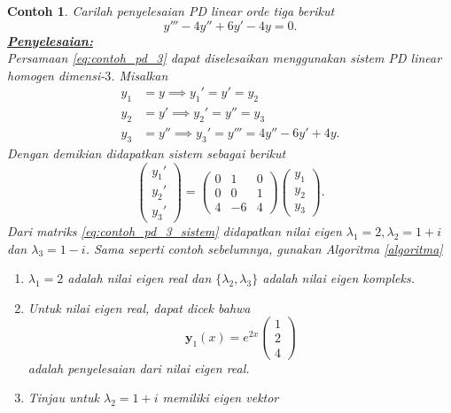 \documentclass[a4paper]{article}
\theoremstyle{definisi}
\newtheorem{contoh}{Contoh}[section]
\newcommand{\penyelesaian}{\textbf{\underline{Penyelesaian:}}\\}
\numberwithin{equation}{section}
\begin{document}
  \begin{contoh}
    Carilah penyelesaian PD linear orde tiga berikut
    \begin{equation}\label{eq:contoh_pd_3}
      y''' - 4y'' + 6y' - 4y = 0.
    \end{equation}
    \penyelesaian
    Persamaan \eqref{eq:contoh_pd_3} dapat diselesaikan menggunakan sistem PD linear homogen dimensi-$3$. Misalkan
    \begin{align*}
      y_1 &= y \implies y_1' = y' = y_2\\
      y_2 &= y' \implies y_2' = y'' = y_3\\
      y_3 &= y''\implies y_3' = y''' = 4y'' - 6y' + 4y.
    \end{align*}
    Dengan demikian didapatkan sistem sebagai berikut
    \begin{equation}\label{eq:contoh_pd_3_sistem}
      \begin{pmatrix}
        y_1'\\
        y_2'\\
        y_3'
      \end{pmatrix} = \begin{pmatrix}
        0 & 1 & 0\\
        0 & 0 & 1\\
        4 & -6 & 4
      \end{pmatrix}\begin{pmatrix}
        y_1\\
        y_2\\
        y_3
      \end{pmatrix}.
    \end{equation}
    Dari matriks \eqref{eq:contoh_pd_3_sistem} didapatkan nilai eigen $\lambda_1 = 2, \lambda_2 = 1+i$ dan $\lambda_3 = 1-i$. Sama seperti contoh sebelumnya, gunakan Algoritma \ref{algoritma} 
    \begin{enumerate}[label=Langkah \arabic*: ,leftmargin=*]
      \item $\lambda_1 = 2$ adalah nilai eigen real dan $\{\lambda_2, \lambda_3\}$ adalah nilai eigen kompleks.
      \item Untuk nilai eigen real, dapat dicek bahwa 
      \[\mathbf{y}_1(x) = e^{2x}\begin{pmatrix}1\\2\\4\end{pmatrix}\]
      adalah penyelesaian dari nilai eigen real.
      \item Tinjau untuk $\lambda_2 = 1+i$ memiliki eigen vektor

\end{enumerate}
\end{contoh}
\end{document}

